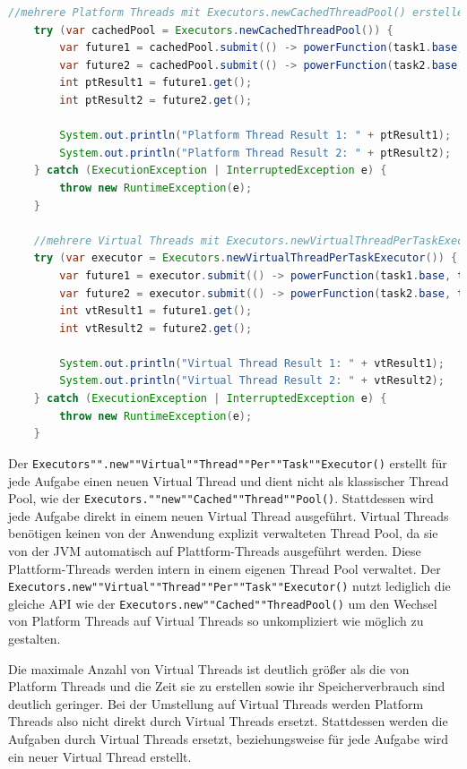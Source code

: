 \documentclass[fontsize=12pt,paper=a4,twoside=semi,parskip=half-,headsepline,headinclude]{scrreprt}
\newcommand{\code}[1]{\texttt{#1}}
\begin{document}
\begin{lstlisting}[language=Java]
	//mehrere Platform Threads mit Executors.newCachedThreadPool() erstellen
	try (var cachedPool = Executors.newCachedThreadPool()) {
		var future1 = cachedPool.submit(() -> powerFunction(task1.base, task1.exponent));
		var future2 = cachedPool.submit(() -> powerFunction(task2.base, task2.exponent));
		int ptResult1 = future1.get();
		int ptResult2 = future2.get();
	
		System.out.println("Platform Thread Result 1: " + ptResult1);
		System.out.println("Platform Thread Result 2: " + ptResult2);
	} catch (ExecutionException | InterruptedException e) {
		throw new RuntimeException(e);
	}

	//mehrere Virtual Threads mit Executors.newVirtualThreadPerTaskExecutor() erstellen
	try (var executor = Executors.newVirtualThreadPerTaskExecutor()) {
		var future1 = executor.submit(() -> powerFunction(task1.base, task1.exponent));
		var future2 = executor.submit(() -> powerFunction(task2.base, task2.exponent));
		int vtResult1 = future1.get();
		int vtResult2 = future2.get();
	
		System.out.println("Virtual Thread Result 1: " + vtResult1);
		System.out.println("Virtual Thread Result 2: " + vtResult2);
	} catch (ExecutionException | InterruptedException e) {
		throw new RuntimeException(e);
	}
\end{lstlisting}
Der \code{Executors"".new""Virtual""Thread""Per""Task""Executor()} erstellt für jede Aufgabe einen neuen Virtual Thread und dient nicht als klassischer Thread Pool, wie der \code{Executors.""new""Cached""Thread""Pool()}. Stattdessen wird jede Aufgabe direkt in einem neuen Virtual Thread ausgeführt. Virtual Threads benötigen keinen von der Anwendung explizit verwalteten Thread Pool, da sie von der JVM automatisch auf Plattform-Threads ausgeführt werden. Diese Plattform-Threads werden intern in einem eigenen Thread Pool verwaltet. Der \code{Executors.new""Virtual""Thread""Per""Task""Executor()} nutzt lediglich die gleiche API wie der \code{Executors.new""Cached""ThreadPool()} um den Wechsel von Platform Threads auf Virtual Threads so unkompliziert wie möglich zu gestalten.

Die maximale Anzahl von Virtual Threads ist deutlich größer als die von Platform Threads und die Zeit sie zu erstellen sowie ihr Speicherverbrauch sind deutlich geringer. Bei der Umstellung auf Virtual Threads werden Platform Threads also nicht direkt durch Virtual Threads ersetzt. Stattdessen werden die Aufgaben durch Virtual Threads ersetzt, beziehungsweise für jede Aufgabe wird ein neuer Virtual Thread erstellt. 
\end{document}
